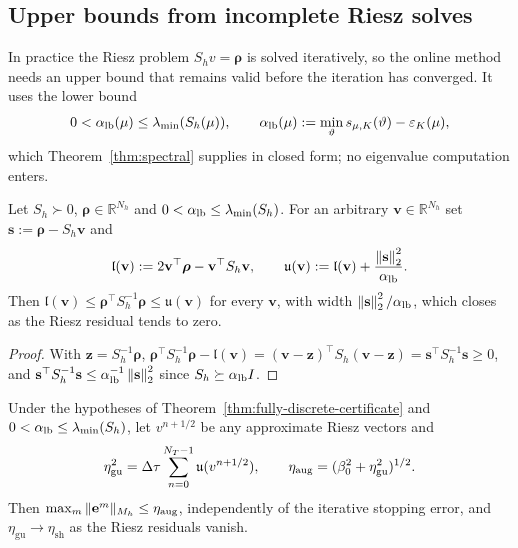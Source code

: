 \documentclass[hidelinks]{siamart251216}
\newcommand{\R}{\mathbb{R}}
\newcommand{\Mh}{M_h}
\newcommand{\Sh}{S_h}
\newcommand{\norm}[1]{\left\lVert #1\right\rVert}
\newcommand{\dt}{\Delta\tau}
\newcommand{\etaSharp}{\eta_{\mathrm{sh}}}
\newcommand{\etaGuar}{\eta_{\mathrm{gu}}}
\newcommand{\ee}{\mathbf e}
\newcommand{\rr}{\bm\rho}
\newcommand{\vv}{\mathbf v}
\newcommand{\zz}{\mathbf z}
\newcommand{\sres}{\mathbf s}
\newcommand{\sym}[1]{#1}                 %
\begin{document}
\subsection{Upper bounds from incomplete Riesz solves}
\label{ssec:guaranteed}
In practice the Riesz problem $\Sh v=\rr$ is solved iteratively, so the online method needs an
upper bound that remains valid before the iteration has converged.  It uses the lower bound
\begin{equation}
  0<\alpha_{\rm lb}(\mu)\le \lambda_{\min}(\Sh(\mu)),
  \qquad \alpha_{\rm lb}(\mu):=\min_\vartheta\sym{s}_{\mu,K}(\vartheta)-\varepsilon_K(\mu),
  \label{eq:alpha-lb}
\end{equation}
which Theorem~\ref{thm:spectral} supplies in closed form; no eigenvalue computation enters.
\begin{lemma}
\label{lem:guaranteed}
Let $\Sh\succ0$, $\rr\in\R^{N_h}$ and $0<\alpha_{\rm lb}\le\lambda_{\min}(\Sh)$.  For an arbitrary
$\vv\in\R^{N_h}$ set $\sres:=\rr-\Sh\vv$ and
\begin{equation}
  \mathfrak l(\vv):=2\vv^\top\rr-\vv^\top\Sh\vv,
  \qquad
  \mathfrak u(\vv):=\mathfrak l(\vv)+\frac{\norm{\sres}_2^2}{\alpha_{\rm lb}}.
  \label{eq:riesz-bracket-def}
\end{equation}
Then $\mathfrak l(\vv)\le\rr^\top\Sh^{-1}\rr\le\mathfrak u(\vv)$ for every $\vv$, with width
$\norm{\sres}_2^2/\alpha_{\rm lb}$, which closes as the Riesz residual tends to zero.
\end{lemma}
\begin{proof}
With $\zz=\Sh^{-1}\rr$, $\rr^\top\Sh^{-1}\rr-\mathfrak l(\vv)=(\vv-\zz)^\top\Sh(\vv-\zz)
=\sres^\top\Sh^{-1}\sres\ge0$, and $\sres^\top\Sh^{-1}\sres\le\alpha_{\rm lb}^{-1}\norm{\sres}_2^2$
since $\Sh\succeq\alpha_{\rm lb}I$.
\end{proof}
\begin{corollary}
\label{cor:guaranteed}
Under the hypotheses of Theorem~\ref{thm:fully-discrete-certificate} and
$0<\alpha_{\rm lb}\le\lambda_{\min}(\Sh)$, let $v^{n+1/2}$ be any approximate Riesz vectors and
\begin{equation}
 \etaGuar^2=\dt\sum_{n=0}^{N_T-1}\mathfrak u(v^{n+1/2}),
 \qquad \eta_{\rm aug}=(\beta_0^2+\etaGuar^2)^{1/2}.
 \label{eq:guaranteed-estimator}
\end{equation}
Then $\max_m\|\ee^m\|_{\Mh}\le\eta_{\rm aug}$, independently of the iterative stopping error,
and $\etaGuar\to\etaSharp$ as the Riesz residuals vanish.
\end{corollary}
\end{document}
